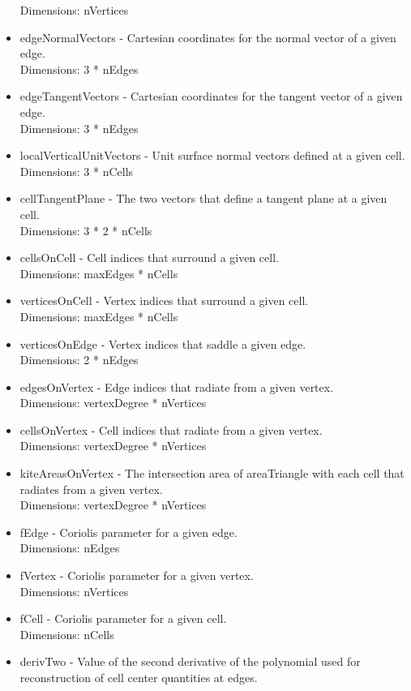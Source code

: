 \documentclass[11pt]{report}
\begin{document}
\begin{itemize}
		  Dimensions: nVertices
	\item edgeNormalVectors - Cartesian coordinates for the normal vector of a given edge. \\
		  Dimensions: 3 * nEdges
	\item edgeTangentVectors - Cartesian coordinates for the tangent vector of a given edge. \\
		  Dimensions: 3 * nEdges
	\item localVerticalUnitVectors - Unit surface normal vectors defined at a given cell. \\
		  Dimensions: 3 * nCells
	\item cellTangentPlane - The two vectors that define a tangent plane at a given cell. \\
		  Dimensions: 3 * 2 * nCells
	\item cellsOnCell - Cell indices that surround a given cell. \\
		  Dimensions: maxEdges * nCells
	\item verticesOnCell - Vertex indices that surround a given cell. \\
		  Dimensions: maxEdges * nCells
	\item verticesOnEdge - Vertex indices that saddle a given edge. \\
		  Dimensions: 2 * nEdges
	\item edgesOnVertex - Edge indices that radiate from a given vertex. \\
		  Dimensions: vertexDegree * nVertices
	\item cellsOnVertex - Cell indices that radiate from a given vertex. \\
		  Dimensions: vertexDegree * nVertices
	\item kiteAreasOnVertex - The intersection area of areaTriangle with each cell that radiates from a given vertex. \\
		  Dimensions: vertexDegree * nVertices
	\item fEdge - Coriolis parameter for a given edge. \\
		  Dimensions: nEdges
	\item fVertex - Coriolis parameter for a given vertex. \\
		  Dimensions: nVertices
	\item fCell - Coriolis parameter for a given cell. \\
		  Dimensions: nCells
	\item derivTwo - Value of the second derivative of the polynomial used for reconstruction of cell center quantities at edges. \\

\end{itemize}
\end{document}
